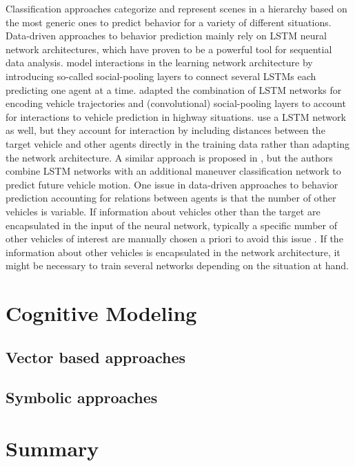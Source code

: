 Classification approaches categorize and represent scenes in a hierarchy \cite{Bonnin2012} based on the most generic ones to predict behavior for a variety of different situations.
Data-driven approaches to behavior prediction mainly rely on \ac{LSTM} neural network architectures, which have proven to be a powerful tool for sequential data analysis.
\cite{Alahi2016} model interactions in the learning network architecture by introducing so-called social-pooling layers to connect several \acp{LSTM} each predicting one agent at a time.
\cite{Deo2018a} adapted the combination of \ac{LSTM} networks for encoding vehicle trajectories and (convolutional) social-pooling layers to account for interactions to vehicle prediction in highway situations.
\cite{Altche2018} use a \ac{LSTM} network as well, but they account for interaction by including distances between the target vehicle and other agents directly in the training data rather than adapting the network architecture.
A similar approach is proposed in \cite{Deo2018}, but the authors combine \ac{LSTM} networks with an additional maneuver classification network to predict future vehicle motion.
One issue in data-driven approaches to behavior prediction accounting for relations between agents is that the number of other vehicles is variable.
If information about vehicles other than the target are encapsulated in the input of the neural network, typically a specific number of other vehicles of interest are manually chosen a priori to avoid this issue \cite{Altche2018, Deo2018}.
If the information about other vehicles is encapsulated in the network architecture, it might be necessary to train several networks depending on the situation at hand.

\section{Cognitive Modeling}
\subsection{Vector based approaches}
\subsection{Symbolic approaches}
\section{Summary}
